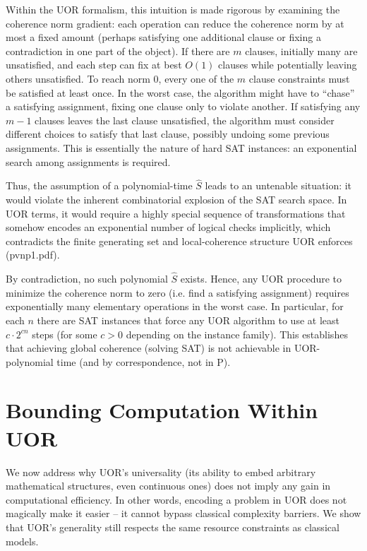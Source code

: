 \documentclass{article}
\begin{document}
Within the UOR formalism, this intuition is made rigorous by examining the coherence norm gradient: each operation can reduce the coherence norm by at most a fixed amount (perhaps satisfying one additional clause or fixing a contradiction in one part of the object). If there are $m$ clauses, initially many are unsatisfied, and each step can fix at best $O(1)$ clauses while potentially leaving others unsatisfied. To reach norm $0$, every one of the $m$ clause constraints must be satisfied at least once. In the worst case, the algorithm might have to “chase” a satisfying assignment, fixing one clause only to violate another. If satisfying any $m-1$ clauses leaves the last clause unsatisfied, the algorithm must consider different choices to satisfy that last clause, possibly undoing some previous assignments. This is essentially the nature of hard SAT instances: an exponential search among assignments is required.

Thus, the assumption of a polynomial-time $\hat{S}$ leads to an untenable situation: it would violate the inherent combinatorial explosion of the SAT search space. In UOR terms, it would require a highly special sequence of transformations that somehow encodes an exponential number of logical checks implicitly, which contradicts the finite generating set and local-coherence structure UOR enforces (pvnp1.pdf).

By contradiction, no such polynomial $\hat{S}$ exists. Hence, any UOR procedure to minimize the coherence norm to zero (i.e. find a satisfying assignment) requires exponentially many elementary operations in the worst case. In particular, for each $n$ there are SAT instances that force any UOR algorithm to use at least $c\cdot 2^{cn}$ steps (for some $c>0$ depending on the instance family). This establishes that achieving global coherence (solving SAT) is not achievable in UOR-polynomial time (and by correspondence, not in P).

\section{Bounding Computation Within UOR}

We now address why UOR’s universality (its ability to embed arbitrary mathematical structures, even continuous ones) does not imply any gain in computational efficiency. In other words, encoding a problem in UOR does not magically make it easier – it cannot bypass classical complexity barriers. We show that UOR’s generality still respects the same resource constraints as classical models.
\end{document}
